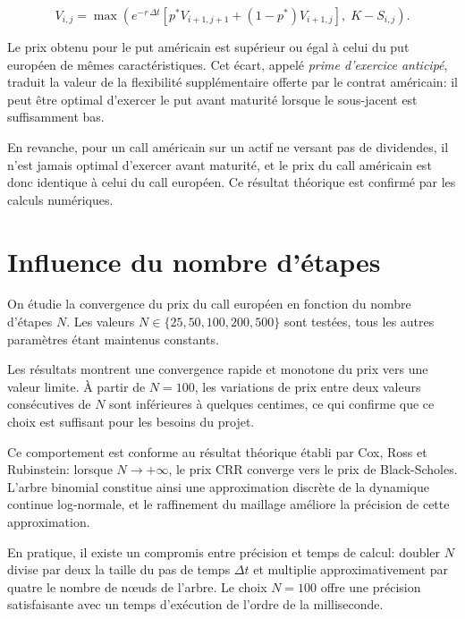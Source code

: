 \documentclass[11pt]{report}
\begin{document}
\[
V_{i,j} = \max\!\left(e^{-r\,\Delta t}\left[p^* V_{i+1,j+1} + (1-p^*)V_{i+1,j}\right],\;
K - S_{i,j}\right).
\]

Le prix obtenu pour le put américain est supérieur ou égal à celui du put européen de mêmes caractéristiques. Cet écart, appelé \textit{prime d'exercice anticipé}, traduit la valeur de la flexibilité supplémentaire offerte par le contrat américain: il peut être optimal d'exercer le put avant maturité lorsque le sous-jacent est suffisamment bas.

En revanche, pour un call américain sur un actif ne versant pas de dividendes, il n'est jamais optimal d'exercer avant maturité, et le prix du call américain est donc identique à celui du call européen. Ce résultat théorique est confirmé par les calculs numériques.

\section{Influence du nombre d'étapes}
\label{sec:influence_n}

On étudie la convergence du prix du call européen en fonction du nombre d'étapes $N$. Les valeurs $N \in \{25, 50, 100, 200, 500\}$ sont testées, tous les autres paramètres étant maintenus constants.

Les résultats montrent une convergence rapide et monotone du prix vers une valeur limite. À partir de $N = 100$, les variations de prix entre deux valeurs consécutives de $N$ sont inférieures à quelques centimes, ce qui confirme que ce choix est suffisant pour les besoins du projet.

Ce comportement est conforme au résultat théorique établi par Cox, Ross et Rubinstein: lorsque $N \to +\infty$, le prix CRR converge vers le prix de Black-Scholes. L'arbre binomial constitue ainsi une approximation discrète de la dynamique continue log-normale, et le raffinement du maillage
améliore la précision de cette approximation.

En pratique, il existe un compromis entre précision et temps de calcul: doubler $N$ divise par deux la taille du pas de temps $\Delta t$ et multiplie approximativement par quatre le nombre de nœuds de l'arbre. Le choix $N = 100$ offre une précision satisfaisante avec un temps d'exécution de l'ordre de la milliseconde.
\end{document}
